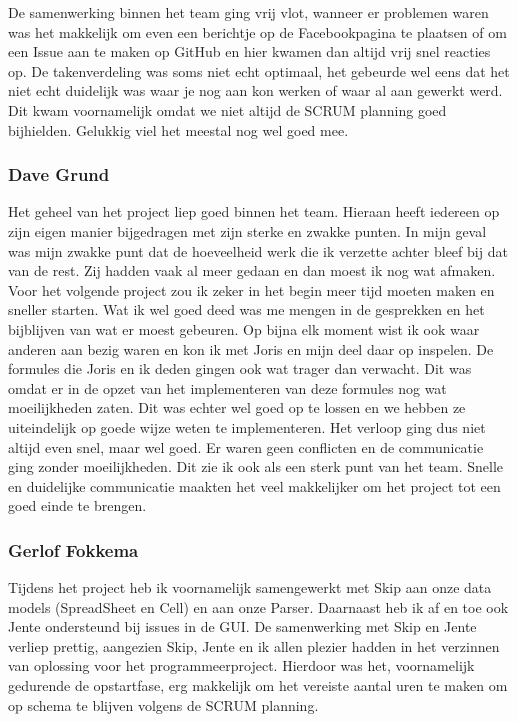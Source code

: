 \documentclass[a4paper,11pt]{article}
\begin{document}
De samenwerking binnen het team ging vrij vlot, wanneer er problemen waren was het makkelijk om even een berichtje op de Facebookpagina te plaatsen of om een Issue aan te maken op GitHub en hier kwamen dan altijd vrij snel reacties op. De takenverdeling was soms niet echt optimaal, het gebeurde wel eens dat het niet echt duidelijk was waar je nog aan kon werken of waar al aan gewerkt werd. Dit kwam voornamelijk omdat we niet altijd de SCRUM planning goed bijhielden. Gelukkig viel het meestal nog wel goed mee.
\subsubsection{Dave Grund}
Het geheel van het project liep goed binnen het team. Hieraan heeft iedereen op zijn eigen manier bijgedragen met zijn sterke en zwakke punten. In mijn geval was mijn zwakke punt dat de hoeveelheid werk die ik verzette achter bleef bij dat van de rest. Zij hadden vaak al meer gedaan en dan moest ik nog wat afmaken. Voor het volgende project zou ik zeker in het begin meer tijd moeten maken en sneller starten. Wat ik wel goed deed was me mengen in de gesprekken en het bijblijven van wat er moest gebeuren. Op bijna elk moment wist ik ook waar anderen aan bezig waren en kon ik met Joris en mijn deel daar op inspelen. De formules die Joris en ik deden gingen ook wat trager dan verwacht. Dit was omdat er in de opzet van het implementeren van deze formules nog wat moeilijkheden zaten. Dit was echter wel goed op te lossen en we hebben ze uiteindelijk op goede wijze weten te implementeren. Het verloop ging dus niet altijd even snel, maar wel goed. Er waren geen conflicten en de communicatie ging zonder moeilijkheden. Dit zie ik ook als een sterk punt van het team. Snelle en duidelijke communicatie maakten het veel makkelijker om het project tot een goed einde te brengen.
\subsubsection{Gerlof Fokkema}
Tijdens het project heb ik voornamelijk samengewerkt met Skip aan onze data models (SpreadSheet en Cell) en aan onze Parser. Daarnaast heb ik af en toe ook Jente ondersteund bij issues in de GUI. De samenwerking met Skip en Jente verliep prettig, aangezien Skip, Jente en ik allen plezier hadden in het verzinnen van oplossing voor het programmeerproject. Hierdoor was het, voornamelijk gedurende de opstartfase, erg makkelijk om het vereiste aantal uren te maken om op schema te blijven volgens de SCRUM planning.\\
\end{document}
